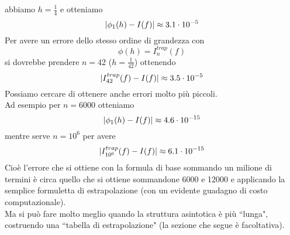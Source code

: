 \documentclass[12pt,a4paper]{article}
\DeclarePairedDelimiter{\abs}{\lvert}{\rvert}
\begin{document}
abbiamo $h = \frac{1}{4}$ e otteniamo
\[\abs{\phi_1(h) - I(f)} \approx 3.1 \cdot 10^{-5}\]
Per avere un errore dello stesso ordine di grandezza con 
\[\phi(h) = I_n^{trap} (f)\]
si dovrebbe prendere $n=42$ ($h=\frac{1}{42}$) ottenendo
\[\abs{I_{42}^{trap}(f) - I(f)} \approx 3.5 \cdot 10^{-5}\]
Possiamo cercare di ottenere anche errori molto più piccoli.\\
Ad esempio per $n=6000$ otteniamo
\[\abs{\phi_1(h) - I(f)} \approx 4.6 \cdot 10^{-15}\]
mentre serve $n = 10^6$ per avere
\[\abs{I_{10^6}^{trap}(f) - I(f)} \approx 6.1 \cdot 10^{-15}\]
Cioè l'errore che si ottiene con la formula di base sommando un milione di termini è circa quello che si ottiene sommandone 6000 e  12000 e applicando la semplice formuletta di estrapolazione (con un evidente guadagno di costo computazionale).\\
Ma si può fare molto meglio quando la struttura asintotica è più ``lunga", costruendo una ``tabella di estrapolazione" (la sezione che segue è facoltativa).
\end{document}
